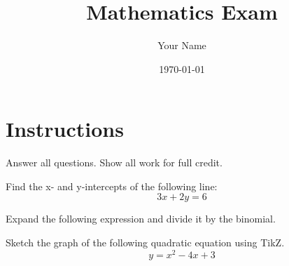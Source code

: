\documentclass[12pt, a4paper, addpoints]{exam}
\begin{document}
\title{Mathematics Exam}
\author{Your Name}
\date{\today}
\maketitle

\section*{Instructions}
Answer all questions. Show all work for full credit.

\begin{questions}

\question Find the x- and y-intercepts of the following line:
\[
3x + 2y = 6
\]

\question Expand the following expression and divide it by the binomial.

\begin{multicols}{2}
\end{multicols}

\question Sketch the graph of the following quadratic equation using TikZ.
\[
y = x^2 - 4x + 3
\]


\end{questions}
\end{document}

